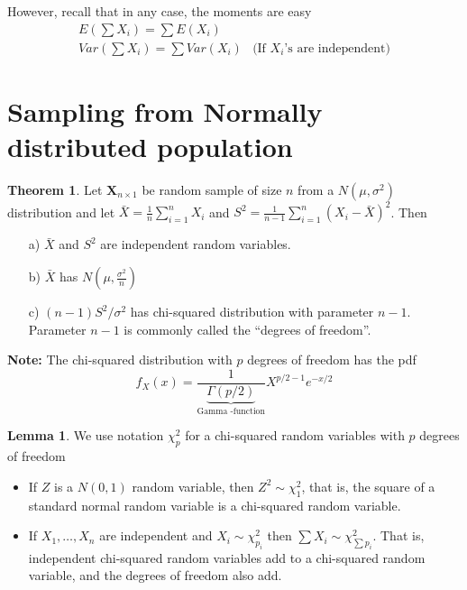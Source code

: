 \documentclass[10pt, twoside, a4paper]{book}
\newcommand{\ud}{\,\mathrm{d}}
\theoremstyle{definition}
\newtheorem{theorem}{Theorem}[chapter]
\newtheorem{lemma}{Lemma}[chapter]
\begin{document}
However, recall that in any case, the moments are easy
\begin{equation*}
\renewcommand{\arraystretch}{1.6}
\begin{array}{ll}
E(\sum X_i) = \sum E(X_i) \\
Var(\sum X_i) = \sum Var(X_i) & \text{(If $X_i$'s are independent)}
\end{array}
\end{equation*}
\section{Sampling from Normally distributed population}
\begin{theorem}
\label{theoremSumOfRVs1}
Let $\bm X_{n \times 1}$ be random sample of size $n$ from a $N(\mu, \sigma^2)$
distribution and let $\bar X = \frac{1}{n}\sum_{i=1}^n X_i$ and $S^2 =
\frac{1}{n-1}\sum_{i=1}^n(X_i-\bar X)^2$. Then
\begin{itemize}
  \item[a)] $\bar X$ and $S^2$ are independent random variables.
  \item[b)] $\bar X$ has $N(\mu, \frac{\sigma^2}{n})$
  \item[c)] $(n-1)S^2/\sigma^2$ has chi-squared distribution with parameter
  $n-1$. Parameter $n-1$ is commonly called the ``degrees of freedom''.
\end{itemize}
\end{theorem}
\textbf{Note:} The chi-squared distribution with $p$ degrees of freedom has the
pdf
$$f_X(x)= \frac{1}{\underbrace{\Gamma(p/2)}_{\text{Gamma
-function}}}X^{p/2-1}e^{-x/2}$$
\begin{itemize}
  \item Gamma -function: $\Gamma(z) = \int_0^\infty x^{z-1}e^{-x}\ud x}2^{p/2}$
\end{itemize}
\begin{lemma}
We use notation $\chi_p^2$ for a chi-squared random variables with $p$ degrees
of freedom
\begin{itemize}
  \item If $Z$ is a $N(0,1)$ random variable, then $Z^2 \sim \chi_1^2$, that is,
  the square of a standard normal random variable is a chi-squared random
  variable. %
  \item If $X_1,\ldots,X_n$ are independent and $X_i \sim \chi_{p_i}^2$ then
  $\sum X_i \sim \chi_{\sum p_i}^2$. That is, independent chi-squared random
  variables add to a chi-squared random variable, and the degrees of freedom
  also add.
\end{itemize}
\end{lemma}
\end{document}
